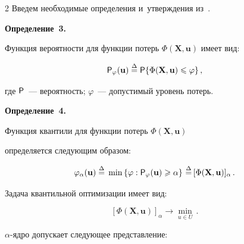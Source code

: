 \begin{multicols}{2}
Введем необходимые определения и~утверждения из~\cite{kankibzun}.



\smallskip



\noindent

\textbf{Определение~3.}\

{Функция вероятности для функции потерь $\Phi(\mathbf X,\mathbf u)$ имеет вид}:

\begin{equation*}

 {\sf P}_\varphi (\mathbf u)\;{\stackrel{\Delta}{=}}\;

 {\sf P}\{\Phi(\mathbf X,\mathbf u)\leqslant \varphi\}\,,


\end{equation*}

{где ${\sf P}$~--- вероятность; $\varphi$~--- допустимый уровень потерь.}



\smallskip



\noindent

\textbf{Определение~4.}\

{Функция квантили для функции потерь $\Phi(\mathbf X,\mathbf u)$ 

определяется следующим образом:}

\begin{equation*}

\varphi_\alpha (\mathbf u)\;{\stackrel{\Delta}{=}}\;\min 

\left\{\varphi: {\sf P}_\varphi (\mathbf u)\geqslant \alpha \right\} 

\,{\stackrel{\Delta}{=}}\,[\Phi(\mathbf X,\mathbf u)]_\alpha\,.


\end{equation*}

Задача квантильной оптимизации имеет вид:

\begin{equation}

[\Phi(\mathbf X,\mathbf u)]_\alpha\to \min\limits_{u\in U}\,.

\label{e4-vas}

\end{equation}

$\alpha$-ядро допускает следующее представление:

\begin{equation*}


\end{equation*}
\end{multicols}
